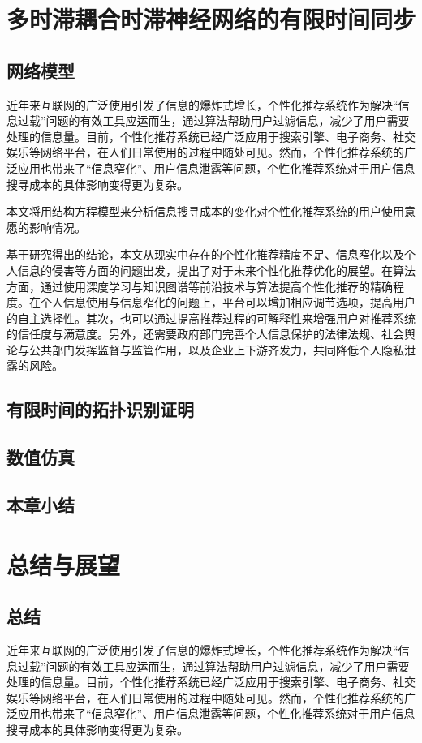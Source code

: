 \documentclass[a4paper,zihao=-4,UTF8]{ctexart}
\numberwithin{equation}{section}
\begin{document}
\newpage
\section{多时滞耦合时滞神经网络的有限时间同步}
	\subsection{网络模型}
	近年来互联网的广泛使用引发了信息的爆炸式增长，个性化推荐系统作为解决“信息过载”问题的有效工具应运而生，通过算法帮助用户过滤信息，减少了用户需要处理的信息量。目前，个性化推荐系统已经广泛应用于搜索引擎、电子商务、社交娱乐等网络平台，在人们日常使用的过程中随处可见。然而，个性化推荐系统的广泛应用也带来了“信息窄化”、用户信息泄露等问题，个性化推荐系统对于用户信息搜寻成本的具体影响变得更为复杂。
	
	本文将用结构方程模型来分析信息搜寻成本的变化对个性化推荐系统的用户使用意愿的影响情况。
	
	基于研究得出的结论，本文从现实中存在的个性化推荐精度不足、信息窄化以及个人信息的侵害等方面的问题出发，提出了对于未来个性化推荐优化的展望。在算法方面，通过使用深度学习与知识图谱等前沿技术与算法提高个性化推荐的精确程度。在个人信息使用与信息窄化的问题上，平台可以增加相应调节选项，提高用户的自主选择性。其次，也可以通过提高推荐过程的可解释性来增强用户对推荐系统的信任度与满意度。另外，还需要政府部门完善个人信息保护的法律法规、社会舆论与公共部门发挥监督与监管作用，以及企业上下游齐发力，共同降低个人隐私泄露的风险。
	\subsection{有限时间的拓扑识别证明}
	\subsection{数值仿真}
	\subsection{本章小结}

\newpage
\section{总结与展望}
	\subsection{总结}
	近年来互联网的广泛使用引发了信息的爆炸式增长，个性化推荐系统作为解决“信息过载”问题的有效工具应运而生，通过算法帮助用户过滤信息，减少了用户需要处理的信息量。目前，个性化推荐系统已经广泛应用于搜索引擎、电子商务、社交娱乐等网络平台，在人们日常使用的过程中随处可见。然而，个性化推荐系统的广泛应用也带来了“信息窄化”、用户信息泄露等问题，个性化推荐系统对于用户信息搜寻成本的具体影响变得更为复杂。
	
\end{document}
